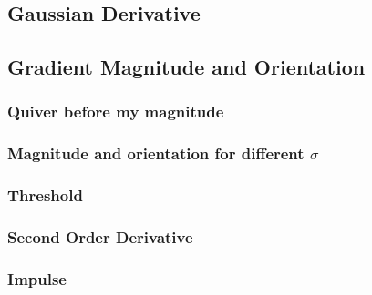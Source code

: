 \documentclass[a4paper,10pt]{article}
\begin{document}
\subsection{Gaussian Derivative}


\subsection{Gradient Magnitude and Orientation}
\subsubsection{Quiver before my magnitude}
\subsubsection{Magnitude and orientation for different $\sigma$}
\subsubsection{Threshold}
\subsubsection{Second Order Derivative}
\subsubsection{Impulse}
\end{document}
